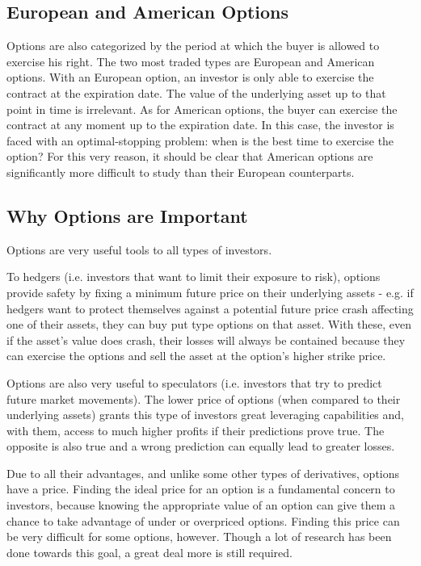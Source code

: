 \subsection{European and American Options}
\label{subsection:european and american options}
Options are also categorized by the period at which the buyer is allowed to exercise his right. The two most traded types are European and American options.
With an European option, an investor is only able to exercise the contract at the expiration date. The value of the underlying asset up to that point in time is irrelevant.
As for American options, the buyer can exercise the contract at any moment up to the expiration date.
In this case, the investor is faced with an optimal-stopping problem: when is the best time to exercise the option?
For this very reason, it should be clear that American options are significantly more difficult to study than their European counterparts.
\fi

\subsection{Why Options are Important}
\label{subsection:why options are important}
Options are very useful tools to all types of investors. 

To hedgers (i.e. investors that want to limit their exposure to risk), options provide safety by fixing a minimum future price on their underlying assets - e.g. if hedgers want to protect themselves against a potential future price crash affecting one of their assets, they can buy put type options on that asset. With these, even if the asset's value does crash, their losses will always be contained because they can exercise the options and sell the asset at the option's higher strike price.

Options are also very useful to speculators (i.e. investors that try to predict future market movements). The lower price of options (when compared to their underlying assets) grants this type of investors great leveraging capabilities and, with them, access to much higher profits if their predictions prove true. The opposite is also true and a wrong prediction can equally lead to greater losses.

Due to all their advantages, and unlike some other types of derivatives, options have a price. Finding the ideal price for an option is a fundamental concern to investors, because knowing the appropriate value of an option can give them a chance to take advantage of under or overpriced options.
Finding this price can be very difficult for some options, however. Though a lot of research has been done towards this goal, a great deal more is still required.

